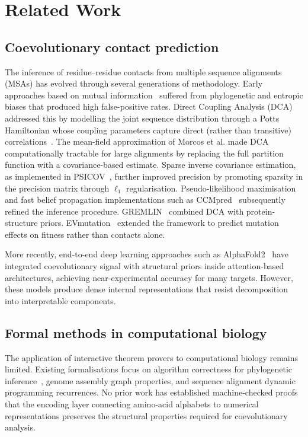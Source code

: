 \section{Related Work}
\label{sec:related}

\subsection{Coevolutionary contact prediction}
The inference of residue--residue contacts from multiple sequence alignments
(MSAs) has evolved through several generations of methodology.  Early
approaches based on mutual information~\cite{dunn2008} suffered from
phylogenetic and entropic biases that produced high false-positive rates.
Direct Coupling Analysis (DCA) addressed this by modelling the joint sequence
distribution through a Potts Hamiltonian whose coupling parameters capture
direct (rather than transitive) correlations~\cite{weigt2009}.  The mean-field
approximation of Morcos et al.\cite{morcos2011} made DCA computationally
tractable for large alignments by replacing the full partition function with a
covariance-based estimate.  Sparse inverse covariance estimation, as
implemented in PSICOV~\cite{jones2012}, further improved precision by
promoting sparsity in the precision matrix through $\ell_1$ regularisation.
Pseudo-likelihood maximisation~\cite{ekeberg2013} and fast belief propagation
implementations such as CCMpred~\cite{seemayer2014} subsequently refined the
inference procedure.  GREMLIN~\cite{kamisetty2013} combined DCA with
protein-structure priors.  EVmutation~\cite{hopf2017} extended the framework
to predict mutation effects on fitness rather than contacts alone.

More recently, end-to-end deep learning approaches such as
AlphaFold2~\cite{jumper2021} have integrated coevolutionary signal with
structural priors inside attention-based architectures, achieving near-experimental
accuracy for many targets.  However, these models produce dense internal
representations that resist decomposition into interpretable components.

\subsection{Formal methods in computational biology}
The application of interactive theorem provers to computational biology
remains limited.  Existing formalisations focus on algorithm correctness for
phylogenetic inference~\cite{lean4}, genome assembly graph properties, and
sequence alignment dynamic programming recurrences.  No prior work has
established machine-checked proofs that the encoding layer connecting amino-acid
alphabets to numerical representations preserves the structural properties
required for coevolutionary analysis.

